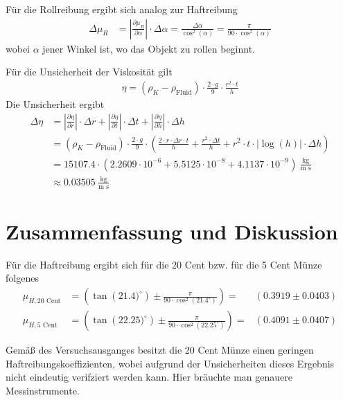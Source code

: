 \documentclass{article}
\begin{document}
Für die Rollreibung ergibt sich analog zur Haftreibung
\begin{align}
\Delta\mu_R &= \left|\frac{\partial \mu_R}{\partial \alpha}\right| \cdot \Delta \alpha = \frac{\Delta\alpha}{\cos^2(\alpha) } = \frac{\pi}{90\cdot \cos^2(\alpha)}
\end{align}
wobei $\alpha$ jener Winkel ist, wo das Objekt zu rollen beginnt.




Für die Unsicherheit der Viskosität gilt
\begin{align}
\eta = (\rho_K - \rho_{\text{Fluid}}) \cdot \frac{2\cdot g}{9 }\cdot \frac{r^2 \cdot t}{h}
\end{align}
Die Unsicherheit ergibt
\begin{align}
\Delta\eta &= \left|\frac{\partial\eta}{\partial r}\right|\cdot \Delta r + \left|\frac{\partial\eta}{\partial t}\right|\cdot \Delta t + \left|\frac{\partial\eta}{\partial h}\right|\cdot \Delta h \\
&= (\rho_K - \rho_{\text{Fluid}})\cdot \frac{2\cdot g}{9} \cdot \left(\frac{2\cdot r \cdot \Delta r\cdot t}{h} + \frac{r^2\cdot\Delta t}{h} + r^2\cdot t \cdot |\log(h)| \cdot \Delta h \right) \\
&= 15107.4 \cdot \left(2.2609\cdot 10^{-6}  + 5.5125\cdot 10^{-8} + 4.1137\cdot 10^{-9}  \right)~\frac{\text{kg}}{\text{m s} } \\
&\approx 0.03505~\frac{\text{kg}}{\text{m s} } 
\end{align}

\newpage
\section{Zusammenfassung und Diskussion}


Für die Haftreibung ergibt sich für die 20 Cent bzw. für die 5 Cent Münze folgenes
\begin{align}
\mu_{H,\text{20 Cent}} &= \left(\tan\left(21.4)^\circ\right) \pm \frac{\pi}{90\cdot \cos^2\left(21.4^\circ\right)} \right) =& (0.3919 \pm 0.0403) \\
\mu_{H,\text{5 Cent}} &= \left(\tan\left(22.25)^\circ\right) \pm \frac{\pi}{90\cdot \cos^2\left(22.25^\circ\right)} \right) =& (0.4091 \pm 0.0407) 
\end{align}

Gemäß des Versuchsausganges besitzt die 20 Cent Münze einen geringen Haftreibungskoeffizienten, wobei aufgrund der Unsicherheiten dieses Ergebnis nicht eindeutig verifziert werden kann. Hier bräuchte man genauere Messinstrumente.
\end{document}
